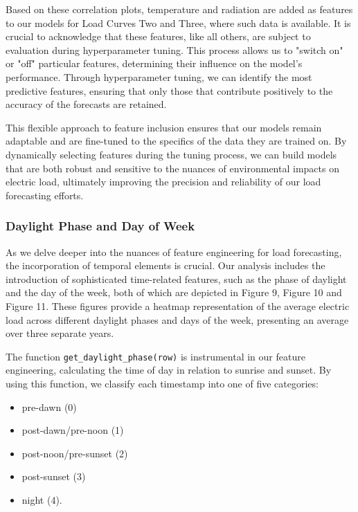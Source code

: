 \documentclass{article} %
\begin{document}
Based on these correlation plots, temperature and radiation are added as features to our models for Load Curves Two and Three, where such data is available. It is crucial to acknowledge that these features, like all others, are subject to evaluation during hyperparameter tuning. This process allows us to "switch on" or "off" particular features, determining their influence on the model's performance. Through hyperparameter tuning, we can identify the most predictive features, ensuring that only those that contribute positively to the accuracy of the forecasts are retained. 

This flexible approach to feature inclusion ensures that our models remain adaptable and are fine-tuned to the specifics of the data they are trained on. By dynamically selecting features during the tuning process, we can build models that are both robust and sensitive to the nuances of environmental impacts on electric load, ultimately improving the precision and reliability of our load forecasting efforts. 

\subsubsection{Daylight Phase and Day of Week }
As we delve deeper into the nuances of feature engineering for load forecasting, the incorporation of temporal elements is crucial. Our analysis includes the introduction of sophisticated time-related features, such as the phase of daylight and the day of the week, both of which are depicted in Figure 9, Figure 10 and Figure 11. These figures provide a heatmap representation of the average electric load across different daylight phases and days of the week, presenting an average over three separate years. 

The function \texttt{get\_daylight\_phase(row)} is instrumental in our feature engineering, calculating the time of day in relation to sunrise and sunset. By using this function, we classify each timestamp into one of five categories: 

\begin{itemize}
    \item pre-dawn (0)
    \item post-dawn/pre-noon (1)
    \item post-noon/pre-sunset (2)
    \item post-sunset (3)
    \item night (4).
\end{itemize}
\end{document}
